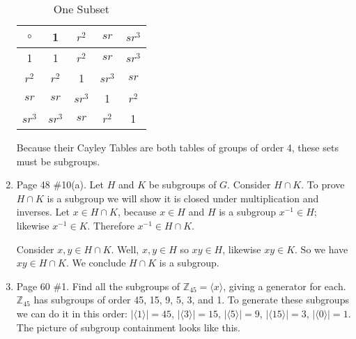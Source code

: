 \documentclass[12pt]{report}
\begin{document}
\begin{enumerate}
      \begin{table}[h]
      \centering
      \caption{One Subset}
      \begin{tabular}{c|cccc}
        $\circ$ &1      &$r^2$  &$sr$   &$sr^3$  \\
        \hline
        1       &1      &$r^2$  &$sr$   &$sr^3$  \\
        $r^2$   &$r^2$  &1      &$sr^3$ &$sr$    \\
        $sr$    &$sr$   &$sr^3$ &1      &$r^2$   \\
        $sr^3$  &$sr^3$ &$sr$   &$r^2$  &1
      \end{tabular}
      \end{table}
      Because their Cayley Tables are both tables of groups of order 4, these
      sets must be subgroups.

\item Page 48 \#10(a). Let $H$ and $K$ be subgroups of $G$. Consider
      $H \cap K$. To prove $H \cap K$ is a subgroup we will show it is closed
      under multiplication and inverses. Let $x \in H \cap K$, because $x \in H$
      and $H$ is a subgroup $x^{-1} \in H$; likewise $x^{-1} \in K$.
      Therefore $x^{-1} \in H \cap K$.

      Consider $x,y \in H \cap K$. Well, $x,y \in H$ so $xy \in H$, likewise
      $xy \in K$. So we have $xy \in H \cap K$. We conclude $H \cap K$ is a
      subgroup.

\item Page 60 \#1.
      Find all the subgroups of $\mathbb{Z}_{45} = \langle x \rangle$, giving a generator
      for each. $\mathbb{Z}_{45}$ has subgroups of order 45, 15, 9, 5, 3, and 1. To
      generate these subgroups we can do it in this order: $|\langle 1 \rangle|
      = 45$, $|\langle 3 \rangle| = 15$, $|\langle 5 \rangle| = 9$, $|\langle 15
      \rangle| = 3$, $|\langle 0 \rangle| = 1$. The picture of subgroup
      containment looks like this.

\begin{figure}[h]
  \centering
{}
\end{figure}
\end{enumerate}
\end{document}
